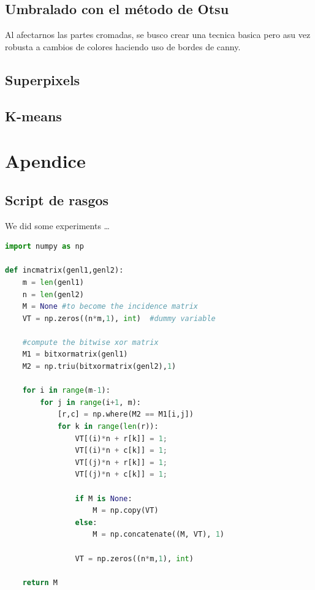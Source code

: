 \documentclass[a4paper, 11pt]{article}
\begin{document}
\subsection{Umbralado con el método de Otsu}

Al afectarnos las partes cromadas, se busco crear una tecnica basica pero asu vez robusta a cambios de colores haciendo uso de bordes de canny.\\

\subsection{Superpixels}

\subsection{K-means}

\pagebreak

\section{Apendice}

\subsection{Script de rasgos}

We did some experiments \ldots

\begin{lstlisting}[language=Python, caption=Python example]
import numpy as np
    
def incmatrix(genl1,genl2):
    m = len(genl1)
    n = len(genl2)
    M = None #to become the incidence matrix
    VT = np.zeros((n*m,1), int)  #dummy variable
    
    #compute the bitwise xor matrix
    M1 = bitxormatrix(genl1)
    M2 = np.triu(bitxormatrix(genl2),1) 

    for i in range(m-1):
        for j in range(i+1, m):
            [r,c] = np.where(M2 == M1[i,j])
            for k in range(len(r)):
                VT[(i)*n + r[k]] = 1;
                VT[(i)*n + c[k]] = 1;
                VT[(j)*n + r[k]] = 1;
                VT[(j)*n + c[k]] = 1;
                
                if M is None:
                    M = np.copy(VT)
                else:
                    M = np.concatenate((M, VT), 1)
                
                VT = np.zeros((n*m,1), int)
    
    return M
\end{lstlisting}
\end{document}
